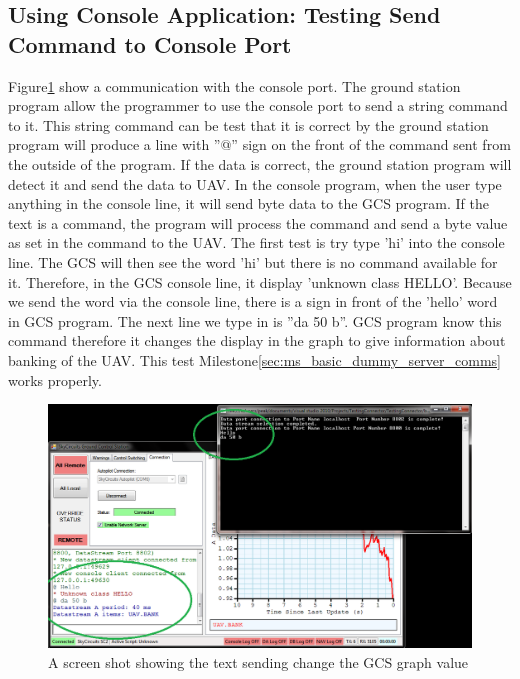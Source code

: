 \subsection{Using Console Application: Testing Send Command to Console Port}

Figure\ref{test text} show a communication with the console port.
The ground station program allow the programmer to use the console port to send a string command to it. 
This string command can be test that it is correct by the ground station program will produce a line with ''@'' sign on the front of the command sent from the outside of the program.
If the data is correct, the ground station program will detect it and send the data to UAV. 
In the console program, when the user type anything in the console line, it will send byte data to the GCS program.
If the text is a command, the program will process the command and send a byte value as set in the command to the UAV.
The first test is try type 'hi' into the console line.
The GCS will then see the word 'hi' but there is no command available for it.
Therefore, in the GCS console line, it display 'unknown class HELLO'.
Because we send the word via the console line, there is a \@ sign in front of the 'hello' word in GCS program.
The next line we type in is ''da 50 b''.
GCS program know this command therefore it changes the display in the graph to give information about banking of the UAV.
This test Milestone\ref{sec:ms_basic_dummy_server_comms} works properly.

\begin{figure}[H]
\begin{center}
\includegraphics[scale=0.5]{testing_screenshots/test_sending_test_text_useful.png}   
\end{center}
\caption{A screen shot showing the text sending change the GCS graph value\label{test text}}
\end{figure}


